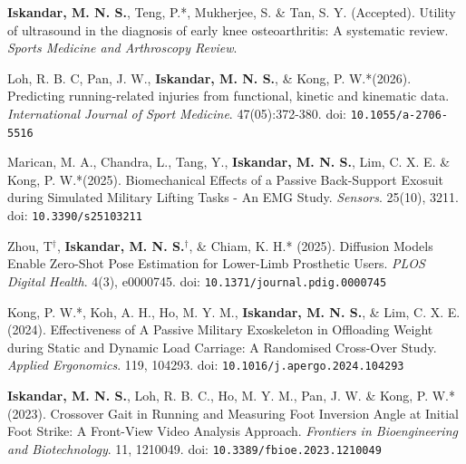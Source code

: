 \documentclass[../main.tex]{subfiles}
\begin{document}
        \begin{etaremune}
            \item\label{article: smar} {\textbf{Iskandar, M. N. S.}, Teng, P.*, Mukherjee, S. \& Tan, S. Y. (Accepted). Utility of ultrasound in the diagnosis of early knee osteoarthritis: A systematic review. \textit{Sports Medicine and Arthroscopy Review}.}

            \item\label{article: ijsm rri} {Loh, R. B. C, Pan, J. W., \textbf{Iskandar, M. N. S.}, \& Kong, P. W.*(2026). Predicting running-related injuries from functional, kinetic and kinematic data. \textit{International Journal of Sport Medicine}. 47(05):372-380. doi: \nolinkurl{10.1055/a-2706-5516} \href{https://doi.org/10.1055/a-2706-5516}{\faFilePdfO}}

            \item\label{article: sensors saf exoskeleton} {Marican, M. A., Chandra, L., Tang, Y., \textbf{Iskandar, M. N. S.}, Lim, C. X. E. \& Kong, P. W.*(2025). Biomechanical Effects of a Passive Back-Support Exosuit during Simulated Military Lifting Tasks - An EMG Study. \textit{Sensors}. 25(10), 3211. doi: \nolinkurl{10.3390/s25103211} \href{https://doi.org/10.3390/s25103211}{\faFilePdfO}} %

            \item\label{article: diffusion_openpose}{Zhou, T$^\dagger$, \textbf{Iskandar, M. N. S.}$^\dagger$, \& Chiam, K. H.* (2025). Diffusion Models Enable Zero-Shot Pose Estimation for Lower-Limb Prosthetic Users. \textit{PLOS Digital Health}. 4(3), e0000745. doi: \nolinkurl{10.1371/journal.pdig.0000745} \href{https://doi.org/10.1371/journal.pdig.0000745}{\faFilePdfO}}

            \item\label{article: spm exoskeleton}{Kong, P. W.*, Koh, A. H., Ho, M. Y. M., \textbf{Iskandar, M. N. S.}, \& Lim, C. X. E. (2024). Effectiveness of A Passive Military Exoskeleton in Offloading Weight during Static and Dynamic Load Carriage: A Randomised Cross-Over Study. \textit{Applied Ergonomics}. 119, 104293. doi: \nolinkurl{10.1016/j.apergo.2024.104293} \href{https://doi.org/10.1016/j.apergo.2024.104293}{\faFilePdfO} \href{https://github.com/Shahril-Iskandar/publication-exoskeleton}{\faGithub}}

            \item\label{article: frontiers crossover gait} {\textbf{Iskandar, M. N. S.}, Loh, R. B. C., Ho, M. Y. M., Pan, J. W. \& Kong, P. W.* (2023). Crossover Gait in Running and Measuring Foot Inversion Angle at Initial Foot Strike: A Front-View Video Analysis Approach. \textit{Frontiers in Bioengineering and Biotechnology}. 11, 1210049. doi: \nolinkurl{10.3389/fbioe.2023.1210049} \href{https://doi.org/10.3389/fbioe.2023.1210049}{\faFilePdfO} \href{https://github.com/Shahril-Iskandar/publication-crossover-gait}{\faGithub}} %
            

\end{etaremune}
\end{document}
